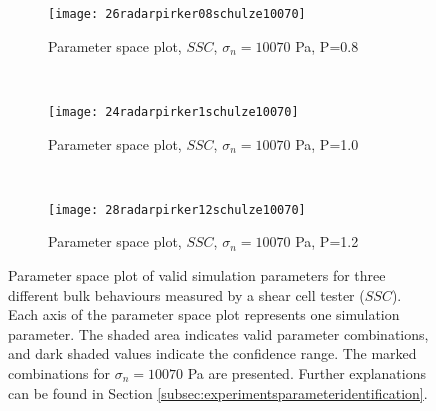 \documentclass[review]{elsarticle}
\begin{document}
\begin{figure}[htp] \centering
        \begin{subfigure}[b]{0.5\columnwidth}
        \texttt{[image: 26radarpirker08schulze10070]}
        \caption{Parameter space plot, $SSC$, $\sigma_n=10070$ Pa, P=0.8}
        \label{fig:26radarpirker08schulze10070} 
    \end{subfigure}\\
     \begin{subfigure}[b]{0.5\columnwidth}
        \texttt{[image: 24radarpirker1schulze10070]}
        \caption{Parameter space plot, $SSC$, $\sigma_n=10070$ Pa, P=1.0}
        \label{fig:24radarpirker1schulze10070}
    \end{subfigure} \\
        \begin{subfigure}[b]{0.5\columnwidth}
        \texttt{[image: 28radarpirker12schulze10070]}
        \caption{Parameter space plot, $SSC$, $\sigma_n=10070$ Pa, P=1.2}
        \label{fig:28radarpirker12schulze10070} 
    \end{subfigure}
    \caption[Parameter space plot of valid simulations parameters for three different
    bulk behaviours measured by SSC]{Parameter space plot of valid simulation
    parameters for three different bulk behaviours measured by a shear cell
    tester ($SSC$).
    Each axis of the parameter space plot represents one simulation parameter.
    The shaded area indicates valid parameter combinations, and dark shaded
    values indicate the confidence range.
	The marked combinations for $\sigma_n=10070$ Pa are presented.
    Further explanations can be found in
   Section \ref{subsec:experimentsparameteridentification}.
   }
    \label{fig:29schulzeradarandcloud}
\end{figure}
\end{document}
